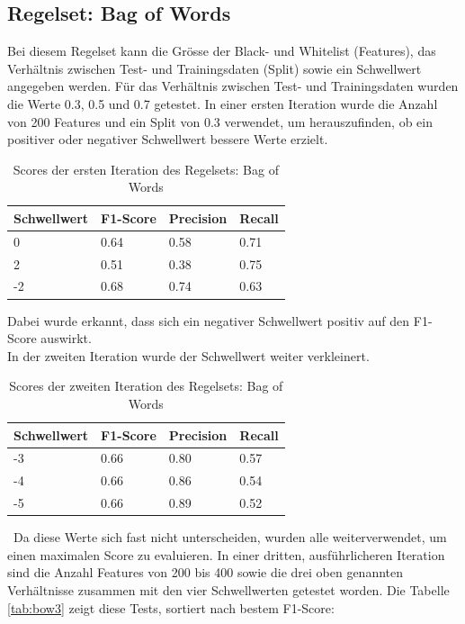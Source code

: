\subsection{Regelset: Bag of Words}
Bei diesem Regelset kann die Grösse der Black- und Whitelist (Features), das Verhältnis zwischen Test- und Trainingsdaten (Split) sowie ein Schwellwert angegeben werden.
Für das Verhältnis zwischen Test- und Trainingsdaten wurden die Werte 0.3, 0.5 und 0.7 getestet.
In einer ersten Iteration wurde die Anzahl von 200 Features und ein Split von 0.3 verwendet, um herauszufinden, ob ein positiver oder negativer Schwellwert bessere Werte erzielt.\\
\begin{table}[H]
	\caption{Scores der ersten Iteration des Regelsets: Bag of Words}
	\centering
\begin{tabular}{|l|l|l|l|}
	\hline
	Schwellwert & F1-Score & Precision & Recall\\
	\hline
	0 & 0.64 & 0.58 & 0.71 \\
	2 & 0.51 & 0.38 & 0.75 \\
	-2 & 0.68 & 0.74 & 0.63 \\
	\hline
\end{tabular}
\end{table}
Dabei wurde erkannt, dass sich ein negativer Schwellwert positiv auf den F1-Score auswirkt.\\
In der zweiten Iteration wurde der Schwellwert weiter verkleinert.\\
\begin{table}[H]
	\caption{Scores der zweiten Iteration des Regelsets: Bag of Words}
	\centering
\begin{tabular}{|l|l|l|l|}
	\hline
	Schwellwert & F1-Score & Precision & Recall\\
	\hline
	-3 & 0.66 & 0.80 & 0.57 \\
	-4 & 0.66 & 0.86 & 0.54 \\
	-5 & 0.66 & 0.89 & 0.52 \\
	\hline
\end{tabular}
\end{table}\
Da diese Werte sich fast nicht unterscheiden, wurden alle weiterverwendet, um einen maximalen Score zu evaluieren.
In einer dritten, ausführlicheren Iteration sind die Anzahl Features von 200 bis 400 sowie die drei oben genannten Verhältnisse zusammen mit den vier Schwellwerten getestet worden. Die Tabelle \cref{tab:bow3} zeigt diese Tests, sortiert nach bestem F1-Score:\\
\FloatBarrier
